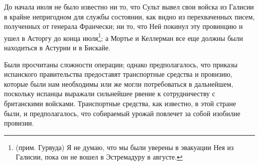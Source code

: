 \documentclass[
  oneside,
  12pt,
  titlepage]{book}
\begin{document}
До начала июля не было известно ни то, что Сульт вывел свои войска из Галисии в крайне непригодном для службы состоянии, как видно из перехваченных писем, полученных от генерала Франчески; ни то, что Ней покинул эту провинцию и ушел в Асторгу до конца июля\footnote{(прим. Гурвуда) Я не думаю, что мы были уверены в эвакуации Нея из Галисии, пока он не вошел в Эстремадуру в августе.}; а Мортье и Келлерман все еще должны были находиться в Астурии и в Бискайе.

Были просчитаны сложности операции; однако предполагалось, что приказы испанского правительства предоставят транспортные средства и провизию, которые были нам необходимы или же могли потребоваться в дальнейшем, поскольку испанцы выражали сильнейшее рвение к сотрудничеству с британскими войсками. Транспортные средства, как известно, в этой стране были, и предполагалось, что собираемый урожай повлечет за собой изобилие провизии.
\end{document}
